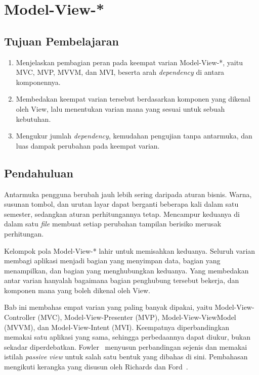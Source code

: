 \chapter{Model-View-*}
\label{bab:mv}

\section*{Tujuan Pembelajaran}

\begin{enumerate}
  \item Menjelaskan pembagian peran pada keempat varian Model-View-*, yaitu
    MVC, MVP, MVVM, dan MVI, beserta arah \textit{dependency} di antara komponennya.
  \item Membedakan keempat varian tersebut berdasarkan komponen yang dikenal
    oleh View, lalu menentukan varian mana yang sesuai untuk sebuah kebutuhan.
  \item Mengukur jumlah \textit{dependency}, kemudahan pengujian tanpa antarmuka,
    dan luas dampak perubahan pada keempat varian.
\end{enumerate}

\section{Pendahuluan}

Antarmuka pengguna berubah jauh lebih sering daripada aturan bisnis. Warna,
susunan tombol, dan urutan layar dapat berganti beberapa kali dalam satu
semester, sedangkan aturan perhitungannya tetap. Mencampur keduanya di dalam
satu \textit{file} membuat setiap perubahan tampilan berisiko merusak perhitungan.

Kelompok pola Model-View-* lahir untuk memisahkan keduanya. Seluruh varian
membagi aplikasi menjadi bagian yang menyimpan data, bagian yang menampilkan,
dan bagian yang menghubungkan keduanya. Yang membedakan antar varian hanyalah
bagaimana bagian penghubung tersebut bekerja, dan komponen mana yang boleh
dikenal oleh View.

Bab ini membahas empat varian yang paling banyak dipakai, yaitu
Model-View-Controller (MVC),
Model-View-Presenter (MVP),
Model-View-ViewModel (MVVM), dan
Model-View-Intent (MVI). Keempatnya
diperbandingkan memakai satu aplikasi yang sama, sehingga perbedaannya dapat
diukur, bukan sekadar diperdebatkan. Fowler~\cite{fowler2006guiarch} menyusun
perbandingan sejenis dan memakai istilah \textit{passive
view} untuk salah satu
bentuk yang dibahas di sini. Pembahasan mengikuti kerangka yang disusun
oleh Richards dan Ford~\cite{richards2020fundamentals}.

